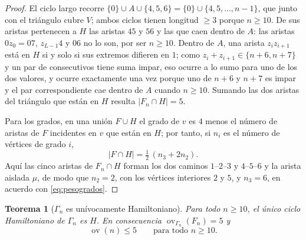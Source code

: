 \documentclass[11pt,a4paper]{article}
\newtheorem{teorema}{Teorema}[section]
\theoremstyle{definition}
\theoremstyle{remark}
\newcommand{\ov}{\operatorname{ov}}
\begin{document}
\begin{proof}
El ciclo largo recorre $\{0\}\cup A\cup\{4,5,6\}=\{0\}\cup\{4,5,\dots,n-1\}$, que junto con el triángulo cubre $V$; ambos ciclos tienen longitud $\ge3$ porque $n\ge10$. De sus aristas pertenecen a $H$ las aristas $45$ y $56$ y las que caen dentro de $A$: las aristas $0z_0=07$, $z_{L-1}4$ y $06$ no lo son, por ser $n\ge10$. Dentro de $A$, una arista $z_iz_{i+1}$ está en $H$ si y solo si sus extremos difieren en $1$; como $z_i+z_{i+1}\in\{n+6,n+7\}$ y un par de consecutivos tiene suma impar, eso ocurre a lo sumo para uno de los dos valores, y ocurre exactamente una vez porque uno de $n+6$ y $n+7$ es impar y el par correspondiente cae dentro de $A$ cuando $n\ge10$. Sumando las dos aristas del triángulo que están en $H$ resulta $|F_n\cap H|=5$.

Para los grados, en una unión $F\cup H$ el grado de $v$ es $4$ menos el número de aristas de $F$ incidentes en $v$ que están en $H$; por tanto, si $n_i$ es el número de vértices de grado $i$,
\begin{equation}\label{eq:pesogrados}
|F\cap H|=\tfrac12\,(n_3+2n_2).
\end{equation}
Aquí las cinco aristas de $F_n\cap H$ forman los dos caminos $1$--$2$--$3$ y $4$--$5$--$6$ y la arista aislada $\mu$, de modo que $n_2=2$, con los vértices interiores $2$ y $5$, y $n_3=6$, en acuerdo con \eqref{eq:pesogrados}.
\end{proof}

\begin{teorema}[$\Gamma_n$ es unívocamente Hamiltoniano]\label{thm:gamma}
Para todo $n\ge10$, el único ciclo Hamiltoniano de $\Gamma_n$ es $H$. En consecuencia $\ov_{\Gamma_n}(F_n)=5$ y
\[
\ov(n)\le5\qquad\text{para todo }n\ge10 .
\]
\end{teorema}
\end{document}
